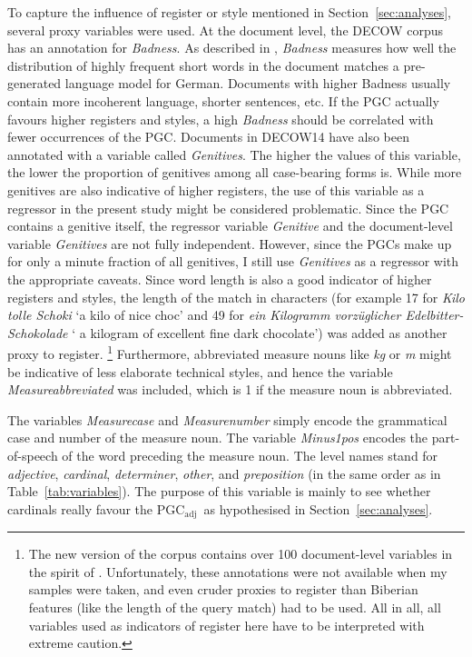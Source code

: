 \documentclass[USenglish]{article}
\newcommand{\Sub}[1]{\ensuremath{\mathrm{_{#1}}}}
\newcommand{\PGCa}{PGC\Sub{adj}}
\begin{document}
To capture the influence of register or style mentioned in Section~\ref{sec:analyses}, several proxy variables were used.
At the document level, the DECOW corpus has an annotation for \textit{Badness}.
As described in \cite{SchaeferEa2013}, \textit{Badness} measures how well the distribution of highly frequent short words in the document matches a pre-generated language model for German.
Documents with higher Badness usually contain more incoherent language, shorter sentences, etc.
If the PGC actually favours higher registers and styles, a high \textit{Badness} should be correlated with fewer occurrences of the PGC.
Documents in DECOW14 have also been annotated with a variable called \textit{Genitives}.
The higher the values of this variable, the lower the proportion of genitives among all case-bearing forms is.
While more genitives are also indicative of higher registers, the use of this variable as a regressor in the present study might be considered problematic.
Since the PGC contains a genitive itself, the regressor variable \textit{Genitive} and the document-level variable \textit{Genitives} are not fully independent.
However, since the PGCs make up for only a minute fraction of all genitives, I still use \textit{Genitives} as a regressor with the appropriate caveats.
Since word length is also a good indicator of higher registers and styles, the length of the match in characters (for example 17 for \textit{Kilo tolle Schoki} `a kilo of nice choc' and 49 for \textit{ein Kilogramm vorzüglicher Edelbitter-Schokolade} ` a kilogram of excellent fine dark chocolate') was added as another proxy to register.%
\footnote{The new version of the corpus contains over 100 document-level variables in the spirit of \cite{Biber1988}.
Unfortunately, these annotations were not available when my samples were taken, and even cruder proxies to register than Biberian features (like the length of the query match) had to be used.
All in all, all variables used as indicators of register here have to be interpreted with extreme caution.
}
Furthermore, abbreviated measure nouns like \textit{kg} or \textit{m} might be indicative of less elaborate technical styles, and hence the variable \textit{Measureabbreviated} was included, which is 1 if the measure noun is abbreviated.

The variables \textit{Measurecase} and \textit{Measurenumber} simply encode the grammatical case and number of the measure noun.
The variable \textit{Minus1pos} encodes the part-of-speech of the word preceding the measure noun.
The level names stand for \textit{adjective}, \textit{cardinal}, \textit{determiner}, \textit{other}, and \textit{preposition} (in the same order as in Table~\ref{tab:variables}).
The purpose of this variable is mainly to see whether cardinals really favour the \PGCa\ as hypothesised in Section~\ref{sec:analyses}.
\end{document}
